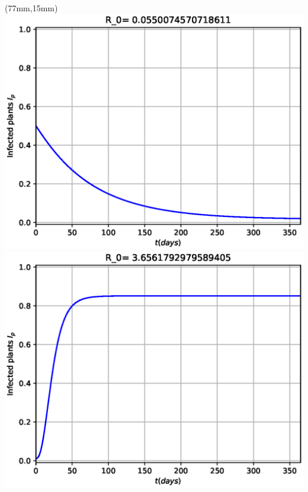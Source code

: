 \documentclass[10pt]{beamer}
\begin{document}
\begin{frame}
\begin{textblock*}{50mm}
		
	\end{textblock*}
	\begin{textblock*}{50mm}(77mm,15mm)
		\includegraphics[width=\linewidth]{Feathergraphics/Tomato_simulation_1.eps}
		\includegraphics[width=\linewidth]{Feathergraphics/Tomato_simulation_2.eps}
	\end{textblock*}	
\end{frame}
%
\end{document}
